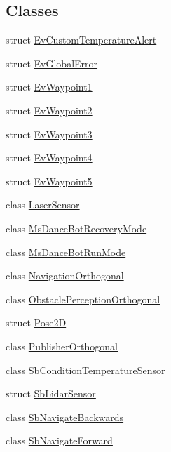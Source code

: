 \subsection*{Classes}
\begin{DoxyCompactItemize}
\item 
struct \hyperlink{structsm__dance__bot_1_1EvCustomTemperatureAlert}{Ev\+Custom\+Temperature\+Alert}
\item 
struct \hyperlink{structsm__dance__bot_1_1EvGlobalError}{Ev\+Global\+Error}
\item 
struct \hyperlink{structsm__dance__bot_1_1EvWaypoint1}{Ev\+Waypoint1}
\item 
struct \hyperlink{structsm__dance__bot_1_1EvWaypoint2}{Ev\+Waypoint2}
\item 
struct \hyperlink{structsm__dance__bot_1_1EvWaypoint3}{Ev\+Waypoint3}
\item 
struct \hyperlink{structsm__dance__bot_1_1EvWaypoint4}{Ev\+Waypoint4}
\item 
struct \hyperlink{structsm__dance__bot_1_1EvWaypoint5}{Ev\+Waypoint5}
\item 
class \hyperlink{classsm__dance__bot_1_1LaserSensor}{Laser\+Sensor}
\item 
class \hyperlink{classsm__dance__bot_1_1MsDanceBotRecoveryMode}{Ms\+Dance\+Bot\+Recovery\+Mode}
\item 
class \hyperlink{classsm__dance__bot_1_1MsDanceBotRunMode}{Ms\+Dance\+Bot\+Run\+Mode}
\item 
class \hyperlink{classsm__dance__bot_1_1NavigationOrthogonal}{Navigation\+Orthogonal}
\item 
class \hyperlink{classsm__dance__bot_1_1ObstaclePerceptionOrthogonal}{Obstacle\+Perception\+Orthogonal}
\item 
struct \hyperlink{structsm__dance__bot_1_1Pose2D}{Pose2D}
\item 
class \hyperlink{classsm__dance__bot_1_1PublisherOrthogonal}{Publisher\+Orthogonal}
\item 
class \hyperlink{classsm__dance__bot_1_1SbConditionTemperatureSensor}{Sb\+Condition\+Temperature\+Sensor}
\item 
struct \hyperlink{structsm__dance__bot_1_1SbLidarSensor}{Sb\+Lidar\+Sensor}
\item 
class \hyperlink{classsm__dance__bot_1_1SbNavigateBackwards}{Sb\+Navigate\+Backwards}
\item 
class \hyperlink{classsm__dance__bot_1_1SbNavigateForward}{Sb\+Navigate\+Forward}
\item 

\end{DoxyCompactItemize}
